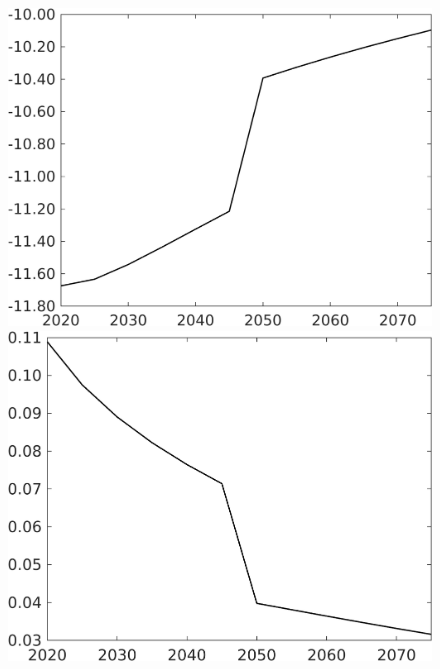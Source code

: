 \documentclass[12pt]{article}
\begin{document}
\begin{figure}[h!!]
\begin{minipage}[]{0.32\textwidth}
	\end{minipage}			
	\begin{minipage}[]{0.32\textwidth}
		\includegraphics[width=1\textwidth]{../../codding_model/own_basedOnFried/optimalPol_010922_revision/figures/all_13Sept22/CompTaufPER_bytaul_Equlab_Reg0_GFF_spillover0_nsk0_xgr0_knspil0_sep1_LFlimit1_emsbase0_countec0_GovRev0_etaa0.79_lgd0.png}
	\end{minipage}		
	\begin{minipage}[]{0.32\textwidth}
		\includegraphics[width=1\textwidth]{../../codding_model/own_basedOnFried/optimalPol_010922_revision/figures/all_13Sept22/CompTaufPER_bytaul_Equlab_Reg0_EY_spillover0_nsk0_xgr0_knspil0_sep1_LFlimit1_emsbase0_countec0_GovRev0_etaa0.79_lgd0.png}
	\end{minipage}	
\end{figure}
\end{document}
